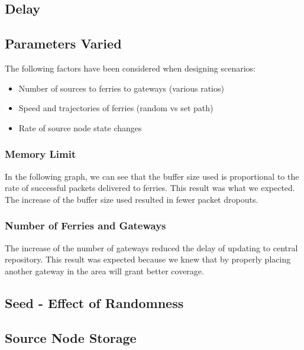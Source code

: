 \subsection{Delay}
%	

\subsection{Parameters Varied} %

The following factors have been considered when designing scenarios:
\begin{itemize}
\item Number of sources to ferries to gateways (various ratios)
\item Speed and trajectories of ferries (random vs set path)
\item Rate of source node state changes
\end{itemize}

\subsubsection{Memory Limit}
In the following graph, we can see that the buffer size used is proportional to the rate of successful packets delivered to ferries.
This result was what we expected.  
The increase of the buffer size used resulted in fewer packet dropouts.

\subsubsection{Number of Ferries and Gateways}
The increase of the number of gateways reduced the delay of updating to central repository.  
This result was expected because we knew that by properly placing another gateway in the area will grant better coverage.  
\subsection{Seed - Effect of Randomness}

\subsection{Source Node Storage}
